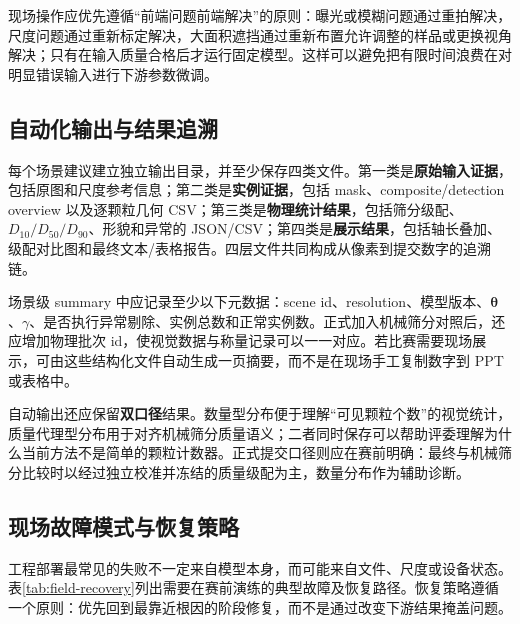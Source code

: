 现场操作应优先遵循“前端问题前端解决”的原则：曝光或模糊问题通过重拍解决，尺度问题通过重新标定解决，大面积遮挡通过重新布置允许调整的样品或更换视角解决；只有在输入质量合格后才运行固定模型。这样可以避免把有限时间浪费在对明显错误输入进行下游参数微调。

\subsection{自动化输出与结果追溯}
\label{sec:deployment-output}

每个场景建议建立独立输出目录，并至少保存四类文件。第一类是\textbf{原始输入证据}，包括原图和尺度参考信息；第二类是\textbf{实例证据}，包括 mask、composite/detection overview 以及逐颗粒几何 CSV；第三类是\textbf{物理统计结果}，包括筛分级配、$D_{10}/D_{50}/D_{90}$、形貌和异常的 JSON/CSV；第四类是\textbf{展示结果}，包括轴长叠加、级配对比图和最终文本/表格报告。四层文件共同构成从像素到提交数字的追溯链。

场景级 summary 中应记录至少以下元数据：scene id、resolution、模型版本、$\boldsymbol{\theta}$、$\gamma$、是否执行异常剔除、实例总数和正常实例数。正式加入机械筛分对照后，还应增加物理批次 id，使视觉数据与称量记录可以一一对应。若比赛需要现场展示，可由这些结构化文件自动生成一页摘要，而不是在现场手工复制数字到 PPT 或表格中。

自动输出还应保留\textbf{双口径}结果。数量型分布便于理解“可见颗粒个数”的视觉统计，质量代理型分布用于对齐机械筛分质量语义；二者同时保存可以帮助评委理解为什么当前方法不是简单的颗粒计数器。正式提交口径则应在赛前明确：最终与机械筛分比较时以经过独立校准并冻结的质量级配为主，数量分布作为辅助诊断。

\subsection{现场故障模式与恢复策略}
\label{sec:deployment-failure-recovery}

工程部署最常见的失败不一定来自模型本身，而可能来自文件、尺度或设备状态。表\ref{tab:field-recovery}列出需要在赛前演练的典型故障及恢复路径。恢复策略遵循一个原则：优先回到最靠近根因的阶段修复，而不是通过改变下游结果掩盖问题。

